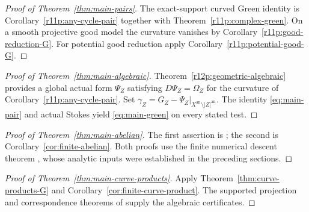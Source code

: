 \documentclass[11pt,reqno]{amsart}
\theoremstyle{definition}
\theoremstyle{remark}
\numberwithin{equation}{section}
\newcommand{\an}{\mathrm{an}}
\begin{document}
\begin{proof}[Proof of Theorem~\ref{thm:main-pairs}]
The exact-support curved Green identity is
Corollary~\ref{r11p:any-cycle-pair} together with
Theorem~\ref{r11p:complex-green}.
On a smooth projective good model the curvature vanishes by
Corollary~\ref{r11p:good-reduction-G}.
For potential good reduction apply
Corollary~\ref{r11p:potential-good-G}.
\end{proof}

\begin{proof}[Proof of Theorem~\ref{thm:main-algebraic}]
Theorem~\ref{r12p:geometric-algebraic} provides a global actual
form $\Psi_Z$ satisfying $D\Psi_Z=\Omega_Z$ for the
curvature of Corollary~\ref{r11p:any-cycle-pair}.
Set $\gamma_Z=G_Z-\Psi_Z|_{X^{\an}\setminus|Z|^{\an}}$.
The identity \eqref{eq:main-pair} and actual Stokes yield
\eqref{eq:main-green} on every stated test.
\end{proof}

\begin{proof}[Proof of Theorem~\ref{thm:main-abelian}]
The first assertion is ; the second is
Corollary~\ref{cor:finite-abelian}.  Both proofs use the finite numerical
descent theorem , whose analytic inputs
were established in the preceding sections.
\end{proof}

\begin{proof}[Proof of Theorem~\ref{thm:main-curve-products}]
Apply Theorem~\ref{thm:curve-products-G} and
Corollary~\ref{cor:finite-curve-product}.
The supported projection and correspondence theorems of
 supply the algebraic certificates.
\end{proof}
\end{document}

